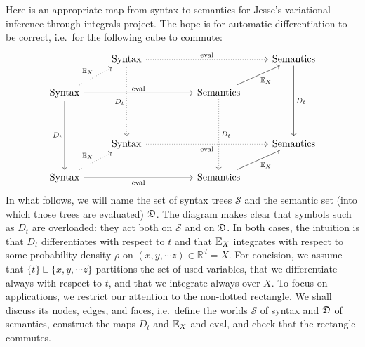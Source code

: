     Here is an appropriate map from syntax to semantics for Jesse's
    variational-inference-through-integrals project.  The hope is for automatic
    differentiation to be correct, i.e.\ for the following cube to commute: 
    $$\begin{tikzcd}
                                                               & {\rm Syntax} \arrow[ddd, "D_t"', dotted] \arrow[rrr, "{\rm eval}", dotted] &  &                                        & {\rm Semantics} \arrow[ddd, "D_t"] \\
    {\rm Syntax} \arrow[ddd, "D_t"'] \arrow[rrr, "{\rm eval}"] \arrow[ru, "\EE_X", dotted] &                                          &  & {\rm Semantics} \arrow[ddd, "D_t", dotted] \arrow[ru, "\EE_X"'] &                      \\
                                                               &                                          &  &                                        &                      \\
                                                               & {\rm Syntax} \arrow[rrr, "{\rm eval}"', dotted]                    &  &                                        & {\rm Semantics}                    \\
    {\rm Syntax} \arrow[rrr, "{\rm eval}"'] \arrow[ru, "\EE_X", dotted]                    &                                          &  & {\rm Semantics} \arrow[ru, "\EE_X"']                    &
    \end{tikzcd}$$
    In what follows, we will name the set of syntax trees $\mathcal S$ and
    the semantic set (into which those trees are evaluated) $\frak D$.
    The diagram makes clear that symbols such as $D_t$ are overloaded: they
    act both on $\mathcal S$ and on $\frak D$.
    In both cases, the intuition is that $D_t$ differentiates with respect to
    $t$ and that ${\mathbb E}_X$ integrates with respect to some probability
    density $\rho$ on $(x, y, \cdots z)\in \mathbb{R}^d = X$.  For concision, we assume
    that $\{t\} \sqcup \{x,y,\cdots z\}$ partitions the set of used variables,
    that we differentiate always with respect to $t$, and that we integrate
    always over $X$.  
    To focus on applications, we restrict our attention to the non-dotted
    rectangle.  We shall discuss its nodes, edges, and faces, i.e.\ define
    the worlds $\mathcal S$ of syntax and $\frak D$ of semantics, construct the
    maps $D_t$ and ${\mathbb E}_X$ and $\text{eval}$, and check that the rectangle
    commutes. 
    
